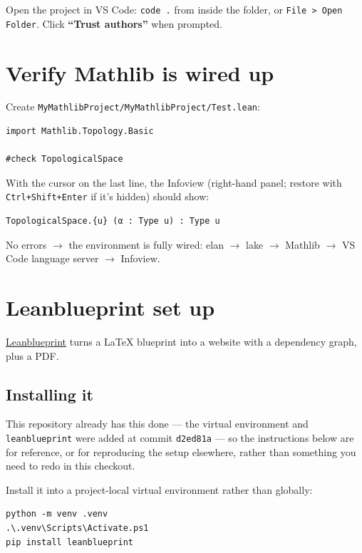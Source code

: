 Open the project in VS Code: \texttt{code .} from inside the folder, or \texttt{File > Open Folder}. Click \textbf{``Trust authors''} when prompted.

\section{Verify Mathlib is wired up}

Create \texttt{MyMathlibProject/MyMathlibProject/Test.lean}:

\begin{verbatim}
import Mathlib.Topology.Basic

#check TopologicalSpace
\end{verbatim}

With the cursor on the last line, the Infoview (right-hand panel; restore with \texttt{Ctrl+Shift+Enter} if it's hidden) should show:

\begin{verbatim}
TopologicalSpace.{u} (α : Type u) : Type u
\end{verbatim}

No errors $\rightarrow$ the environment is fully wired: elan $\rightarrow$ lake $\rightarrow$ Mathlib $\rightarrow$ VS Code language server $\rightarrow$ Infoview.

\section{Leanblueprint set up}

\href{https://github.com/PatrickMassot/leanblueprint}{Leanblueprint} turns a LaTeX blueprint into a website with a dependency graph, plus a PDF.

\subsection{Installing it}

This repository already has this done --- the virtual environment and \texttt{leanblueprint} were added at commit \texttt{d2ed81a} --- so the instructions below are for reference, or for reproducing the setup elsewhere, rather than something you need to redo in this checkout.

Install it into a project-local virtual environment rather than globally:

\begin{verbatim}
python -m venv .venv
.\.venv\Scripts\Activate.ps1
pip install leanblueprint
\end{verbatim}

